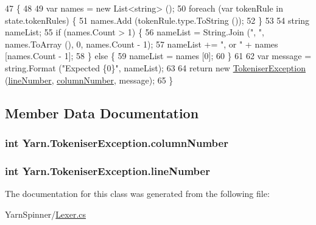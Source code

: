 \begin{DoxyCode}
47                                                                                                            
                       \{
48 
49             var names = \textcolor{keyword}{new} List<string> ();
50             \textcolor{keywordflow}{foreach} (var tokenRule \textcolor{keywordflow}{in} state.tokenRules) \{
51                 names.Add (tokenRule.type.ToString ());
52             \}
53 
54             \textcolor{keywordtype}{string} nameList;
55             \textcolor{keywordflow}{if} (names.Count > 1) \{
56                 nameList = String.Join (\textcolor{stringliteral}{", "}, names.ToArray (), 0, names.Count - 1);
57                 nameList += \textcolor{stringliteral}{", or "} + names [names.Count - 1];
58             \} \textcolor{keywordflow}{else} \{
59                 nameList = names [0];
60             \}
61 
62             var message = string.Format (\textcolor{stringliteral}{"Expected \{0\}"}, nameList);
63             
64             \textcolor{keywordflow}{return} \textcolor{keyword}{new} \hyperlink{a00148_ad00fcf742d2b0d476ce43b27a3f3b6c1}{TokeniserException} (\hyperlink{a00148_a54b936d7b4f26f88a07a66c5fc1d1ad1}{lineNumber}, 
      \hyperlink{a00148_aabf2ad38f3984297c1daede9be55e3d6}{columnNumber}, message);
65         \}
\end{DoxyCode}


\subsection{Member Data Documentation}
\hypertarget{a00148_aabf2ad38f3984297c1daede9be55e3d6}{
\subsubsection[{column\-Number}]{\setlength{\rightskip}{0pt plus 5cm}int Yarn.\-Tokeniser\-Exception.\-column\-Number}}\label{a00148_aabf2ad38f3984297c1daede9be55e3d6}
\hypertarget{a00148_a54b936d7b4f26f88a07a66c5fc1d1ad1}{
\subsubsection[{line\-Number}]{\setlength{\rightskip}{0pt plus 5cm}int Yarn.\-Tokeniser\-Exception.\-line\-Number}}\label{a00148_a54b936d7b4f26f88a07a66c5fc1d1ad1}


The documentation for this class was generated from the following file\-:\begin{DoxyCompactItemize}
\item 
Yarn\-Spinner/\hyperlink{a00263}{Lexer.\-cs}\end{DoxyCompactItemize}
